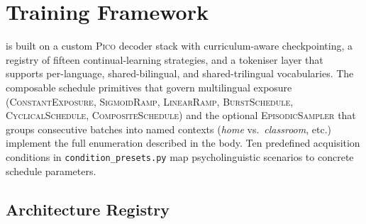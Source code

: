 



\section{\beetle{} Training Framework}\label{sec:train}

\beetle{} is built on a custom \textsc{Pico} decoder stack \citep{diehl-martinez-etal-2025-pico} with curriculum-aware checkpointing, a registry of fifteen continual-learning strategies, and a tokeniser layer that supports per-language, shared-bilingual, and shared-trilingual vocabularies. The composable schedule primitives that govern multilingual exposure (\textsc{ConstantExposure}, \textsc{SigmoidRamp}, \textsc{LinearRamp}, \textsc{BurstSchedule}, \textsc{CyclicalSchedule}, \textsc{CompositeSchedule}) and the optional \textsc{EpisodicSampler} that groups consecutive batches into named contexts (\emph{home} vs.\ \emph{classroom}, etc.) implement the full enumeration described in the body. Ten predefined acquisition conditions in \texttt{condition\_presets.py} map psycholinguistic scenarios to concrete schedule parameters.

\subsection{Architecture Registry}\label{sec:beetle-architecture-registry}

